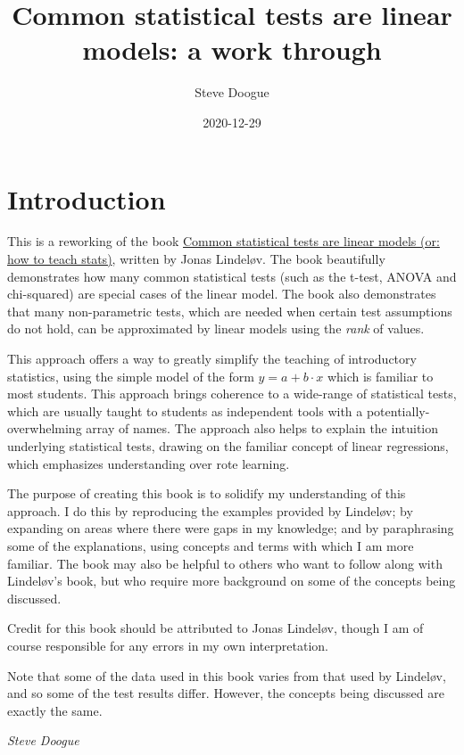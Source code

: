 \documentclass[
  12pt,
]{krantz}
\title{Common statistical tests are linear models: a work through}
\author{Steve Doogue}
\date{2020-12-29}
\begin{document}
\maketitle

{
\setcounter{tocdepth}{1}
\tableofcontents
}
\hypertarget{introduction}{%
\chapter{Introduction}\label{introduction}}

This is a reworking of the book \href{https://lindeloev.github.io/tests-as-linear/}{Common statistical tests are linear models (or: how to teach stats)}, written by Jonas Lindeløv. The book beautifully demonstrates how many common statistical tests (such as the t-test, ANOVA and chi-squared) are special cases of the linear model. The book also demonstrates that many non-parametric tests, which are needed when certain test assumptions do not hold, can be approximated by linear models using the \emph{rank} of values.

This approach offers a way to greatly simplify the teaching of introductory statistics, using the simple model of the form \(y = a + b \cdot x\) which is familiar to most students. This approach brings coherence to a wide-range of statistical tests, which are usually taught to students as independent tools with a potentially-overwhelming array of names. The approach also helps to explain the intuition underlying statistical tests, drawing on the familiar concept of linear regressions, which emphasizes understanding over rote learning.

The purpose of creating this book is to solidify my understanding of this approach. I do this by reproducing the examples provided by Lindeløv; by expanding on areas where there were gaps in my knowledge; and by paraphrasing some of the explanations, using concepts and terms with which I am more familiar. The book may also be helpful to others who want to follow along with Lindeløv's book, but who require more background on some of the concepts being discussed.

Credit for this book should be attributed to Jonas Lindeløv, though I am of course responsible for any errors in my own interpretation.

Note that some of the data used in this book varies from that used by Lindeløv, and so some of the test results differ. However, the concepts being discussed are exactly the same.

\emph{Steve Doogue}
\end{document}
